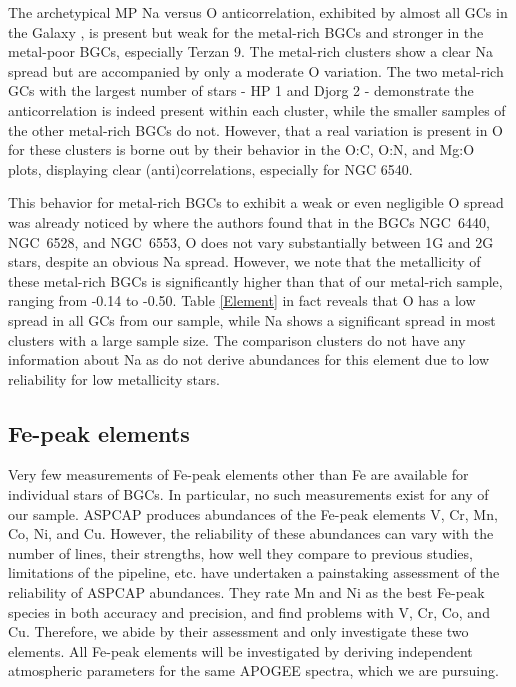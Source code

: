 \documentclass[onecolumn]{aa}
\begin{document}
The archetypical MP Na versus O anticorrelation, exhibited by almost all GCs in the Galaxy \citep{Carretta2009}, is present but weak for the metal-rich BGCs and stronger in the metal-poor BGCs, especially Terzan 9. The metal-rich clusters show a clear Na spread but are accompanied by only a moderate 
O variation. The two metal-rich GCs with the largest number of stars - HP 1 and Djorg 2 - demonstrate the anticorrelation is indeed present within each cluster, while the smaller samples of the other metal-rich BGCs do not. However, that a real variation is present in O for these clusters is borne out by their behavior in the O:C, O:N, and Mg:O plots, displaying clear (anti)correlations, especially for NGC 6540.

This behavior for metal-rich BGCs to exhibit a weak or even negligible O spread was already noticed by \citet{Munoz2017, Munoz2018, Munoz2020} where the authors found that in the BGCs NGC~6440, NGC~6528, and NGC~6553, O does not vary substantially between 1G and 2G stars, despite an obvious Na spread.  However, we note that the metallicity of these metal-rich BGCs is  significantly higher than that of our metal-rich sample, ranging from -0.14 to -0.50.
Table \ref{Element} in fact reveals that O has a low spread in all GCs from our sample, while Na shows a significant spread in most clusters with a large sample size. 
The comparison clusters do
not have any information about Na as \citet{Masseron2019} do not derive abundances for this element due to low reliability for low metallicity stars.


\subsection{Fe-peak elements}

Very few measurements of Fe-peak elements other than Fe are available for individual stars of BGCs. In particular, no such measurements exist for any of our sample. ASPCAP produces abundances of the Fe-peak elements V, Cr, Mn, Co, Ni, and Cu. However, the reliability of these abundances can vary with the number of lines, their strengths, how well they compare to previous studies, limitations of the pipeline, etc. \citet{Henrik2020} have undertaken a painstaking assessment of the reliability of ASPCAP abundances. They rate Mn and Ni as the best Fe-peak species in both accuracy and precision, and find problems with V, Cr, Co, and Cu. Therefore, we abide by their assessment and only investigate these two elements. All Fe-peak elements will be investigated by deriving independent atmospheric parameters for the same APOGEE spectra, which we are pursuing.
\end{document}
